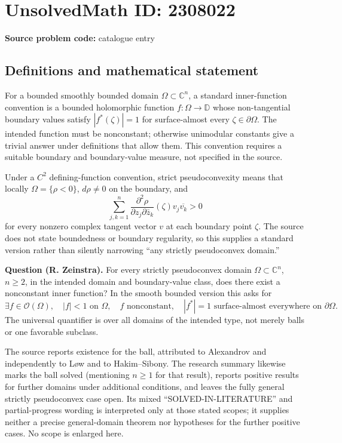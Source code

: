 \documentclass[11pt]{article}
\newcommand{\C}{\mathbb{C}}
\begin{document}
\section*{UnsolvedMath ID: 2308022}
\textbf{Source problem code:} catalogue entry
\subsection{Definitions and mathematical statement}
For a bounded smoothly bounded domain $\Omega\subset\C^n$, a standard inner-function convention is a bounded holomorphic function $f:\Omega\to\mathbb D$ whose non-tangential boundary values satisfy $|f^*(\zeta)|=1$ for surface-almost every $\zeta\in\partial\Omega$. The intended function must be nonconstant; otherwise unimodular constants give a trivial answer under definitions that allow them. This convention requires a suitable boundary and boundary-value measure, not specified in the source.

Under a $C^2$ defining-function convention, strict pseudoconvexity means that locally $\Omega=\{\rho<0\}$, $d\rho\ne0$ on the boundary, and
\[
 \sum_{j,k=1}^n\frac{\partial^2\rho}{\partial z_j\partial\bar z_k}(\zeta)
               v_j\overline{v_k}>0
\]
for every nonzero complex tangent vector $v$ at each boundary point $\zeta$. The source does not state boundedness or boundary regularity, so this supplies a standard version rather than silently narrowing ``any strictly pseudoconvex domain.''

\textbf{Question (R. Zeinstra).} For every strictly pseudoconvex domain $\Omega\subset\C^n$, $n\geq2$, in the intended domain and boundary-value class, does there exist a nonconstant inner function? In the smooth bounded version this asks for
\[
 \exists f\in\mathcal O(\Omega),\quad |f|<1\text{ on }\Omega,\quad
 f\text{ nonconstant},\quad |f^*|=1\text{ surface-almost everywhere on }\partial\Omega.
\]
The universal quantifier is over all domains of the intended type, not merely balls or one favorable subclass.

The source reports existence for the ball, attributed to Alexandrov and independently to L\o w and to Hakim--Sibony. The research summary likewise marks the ball solved (mentioning $n\geq1$ for that result), reports positive results for further domains under additional conditions, and leaves the fully general strictly pseudoconvex case open. Its mixed ``SOLVED-IN-LITERATURE'' and partial-progress wording is interpreted only at those stated scopes; it supplies neither a precise general-domain theorem nor hypotheses for the further positive cases. No scope is enlarged here.
\end{document}
